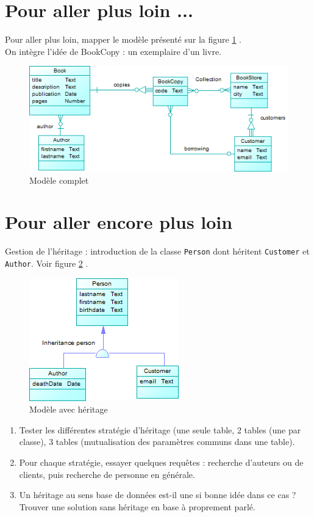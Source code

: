 \documentclass[small,algo]{dushClass}
\begin{document}
\section{Pour aller plus loin ...}
Pour aller plus loin, mapper le modèle présenté sur la figure \ref{model-real} .\\

On intègre l'idée de BookCopy : un exemplaire d'un livre.

\begin{figure}[ht]
	\center
	\includegraphics{images/model_real.png}
	\caption{Modèle complet}\label{model-real}
\end{figure}


\section{Pour aller encore plus loin}

Gestion de l'héritage : introduction de la classe \texttt{Person} dont héritent \texttt{Customer} et \texttt{Author}. Voir figure \ref{model-inheritance} .\\


\begin{figure}[ht]
	\center
	\includegraphics{images/model_inheritance.png}
	\caption{Modèle avec héritage}\label{model-inheritance}
\end{figure}

\begin{enumerate}
\item Tester les différentes stratégie d'héritage (une seule table, 2 tables (une par classe), 3 tables (mutualisation des paramètres communs dans une table).
\item Pour chaque stratégie, essayer quelques requêtes : recherche d'auteurs ou de clients, puis recherche de personne en générale.
\item Un héritage au sens base de données est-il une si bonne idée dans ce cas ? Trouver une solution sans héritage en base à proprement parlé.
\end{enumerate}
\end{document}
